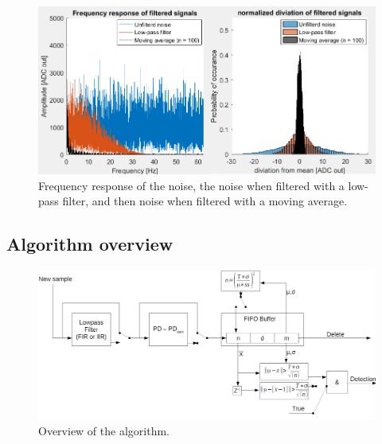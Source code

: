 \begin{figure}
	\includegraphics[width=\textwidth]{pics/FiltersVsNoise.png}
	\caption{Frequency response of the noise, the noise when filtered with a low-pass filter, and then noise when filtered with a moving average.}
	\label{fig:FilterVsNoise}
\end{figure}

\subsection{Algorithm overview}


\begin{figure}
	\includegraphics[angle=90,width=\textwidth]{pics/allSTDbasedAlgorithms_expanded.png}
	\caption{Overview of the algorithm.}
	\label{fig:fullAlgorithm}
\end{figure}
